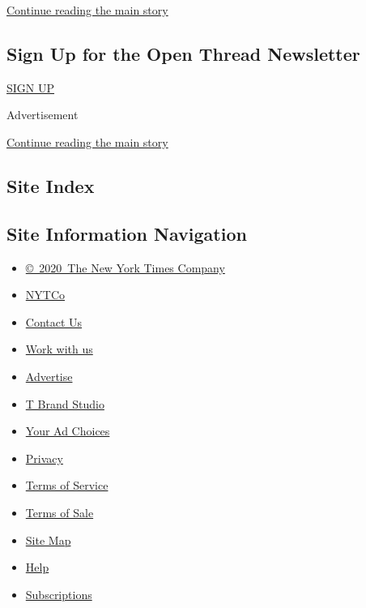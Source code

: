 \protect\hyperlink{after-mid2}{Continue reading the main story}

\hypertarget{sign-up-for-the-open-thread-newsletter}{%
\subsection{Sign Up for the Open Thread
Newsletter}\label{sign-up-for-the-open-thread-newsletter}}

\href{/newsletters/signup/TZ}{SIGN UP}

Advertisement

\protect\hyperlink{after-mktg}{Continue reading the main story}

\hypertarget{site-index}{%
\subsection{Site Index}\label{site-index}}

\hypertarget{site-information-navigation}{%
\subsection{Site Information
Navigation}\label{site-information-navigation}}

\begin{itemize}
\tightlist
\item
  \href{https://help.nytimes3xbfgragh.onion/hc/en-us/articles/115014792127-Copyright-notice}{©~2020~The
  New York Times Company}
\end{itemize}

\begin{itemize}
\tightlist
\item
  \href{https://www.nytco.com/}{NYTCo}
\item
  \href{https://help.nytimes3xbfgragh.onion/hc/en-us/articles/115015385887-Contact-Us}{Contact
  Us}
\item
  \href{https://www.nytco.com/careers/}{Work with us}
\item
  \href{https://nytmediakit.com/}{Advertise}
\item
  \href{http://www.tbrandstudio.com/}{T Brand Studio}
\item
  \href{https://www.nytimes3xbfgragh.onion/privacy/cookie-policy\#how-do-i-manage-trackers}{Your
  Ad Choices}
\item
  \href{https://www.nytimes3xbfgragh.onion/privacy}{Privacy}
\item
  \href{https://help.nytimes3xbfgragh.onion/hc/en-us/articles/115014893428-Terms-of-service}{Terms
  of Service}
\item
  \href{https://help.nytimes3xbfgragh.onion/hc/en-us/articles/115014893968-Terms-of-sale}{Terms
  of Sale}
\item
  \href{https://spiderbites.nytimes3xbfgragh.onion}{Site Map}
\item
  \href{https://help.nytimes3xbfgragh.onion/hc/en-us}{Help}
\item
  \href{https://www.nytimes3xbfgragh.onion/subscription?campaignId=37WXW}{Subscriptions}
\end{itemize}
